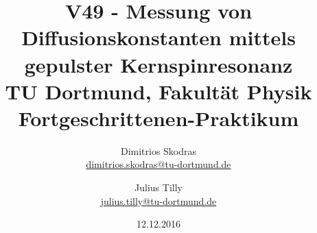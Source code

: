 

\usepackage{xfrac}
\usepackage{xcolor}
\usepackage{setspace}\usepackage{threeparttable}
\usepackage{fancyhdr}
\usepackage{graphicx}
\usepackage[official]{eurosym}
\usepackage{geometry}


\title{V49 - Messung von Diffusionskonstanten mittels gepulster Kernspinresonanz\\
\hspace{15cm}%
	\large TU Dortmund, Fakultät Physik\\ 
	\normalsize Fortgeschrittenen-Praktikum}

\author{Dimitrios Skodras\\			%
	{\small \href{dimitrios.skodras@tu-dortmund.de}{dimitrios.skodras@tu-dortmund.de}}	%
	\and						%
	Julius Tilly\\					%
	{\small \href{julius.tilly@tu-dortmund.de}{julius.tilly@tu-dortmund.de}}		%
}
\date{12.12.2016}				%



	

\maketitle					%
\thispagestyle{empty} 				%



\tableofcontents


